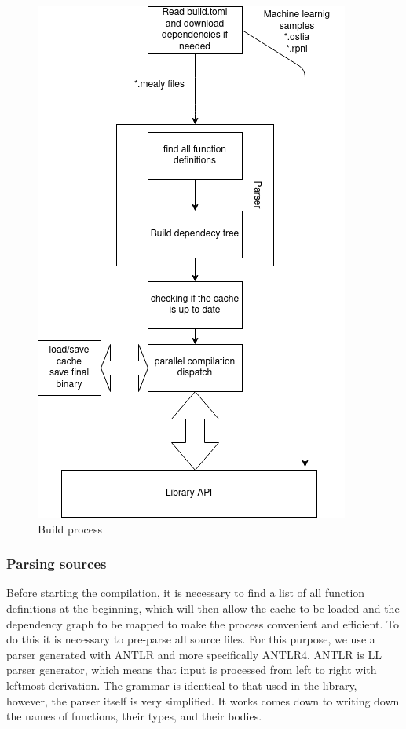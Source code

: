 \begin{figure}
\centering
\includegraphics[width=391px, scale=1]{./diagram.png}
\caption{Build process}
\label{buildsystem:diagram}
\end{figure}

\hypertarget{parsing-sources}{%
\subsubsection{Parsing sources}\label{dependency-resolving}}

Before starting the compilation, it is necessary to find a list of all
function definitions at the beginning, which will then allow the cache
to be loaded and the dependency graph to be mapped to make the process
convenient and efficient. To do this it is necessary to pre-parse all
source files. 
For this purpose, we use a parser generated with ANTLR and more specifically
ANTLR4. ANTLR is LL parser generator, which means that input is processed
from left to right with leftmost derivation. The grammar is identical to that used
in the library, however, the parser itself is very simplified. It works
comes down to writing down the names of functions, their types, and their bodies. 

